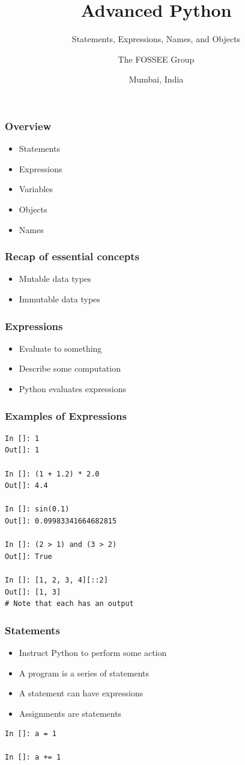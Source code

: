 \documentclass[14pt,compress]{beamer}
\title[Names and Objects]{Advanced Python}
\subtitle{Statements, Expressions, Names, and Objects}
\author[FOSSEE] {The FOSSEE Group}
\institute[IIT Bombay] {Department of Aerospace Engineering\\IIT Bombay}
\date[] {Mumbai, India}
\begin{document}
\begin{frame}
  \titlepage
\end{frame}

\begin{frame}
  \frametitle{Overview}
  \begin{itemize}
  \item Statements
  \item Expressions
  \item Variables
  \item Objects
  \item Names
  \end{itemize}
\end{frame}

\begin{frame}
  \frametitle{Recap of essential concepts}
  \begin{itemize}
  \item Mutable data types
  \item Immutable data types
  \end{itemize}
\end{frame}

\begin{frame}
  \frametitle{Expressions}
  \begin{itemize}
  \item Evaluate to something
  \item Describe some computation
  \item Python evaluates expressions
  \end{itemize}
\end{frame}

\begin{frame}[fragile]
  \frametitle{Examples of Expressions}
  \small
  \begin{lstlisting}
In []: 1
Out[]: 1

In []: (1 + 1.2) * 2.0
Out[]: 4.4

In []: sin(0.1)
Out[]: 0.09983341664682815

In []: (2 > 1) and (3 > 2)
Out[]: True

In []: [1, 2, 3, 4][::2]
Out[]: [1, 3]
# Note that each has an output
  \end{lstlisting}
\end{frame}

\begin{frame}[fragile]
  \frametitle{Statements}
  \begin{itemize}
  \item Instruct Python to perform some action
  \item A program is a series of statements
  \item A statement can have expressions
  \item Assignments are statements
  \end{itemize}
\begin{lstlisting}
In []: a = 1

In []: a += 1
\end{lstlisting}
\end{frame}
\end{document}
